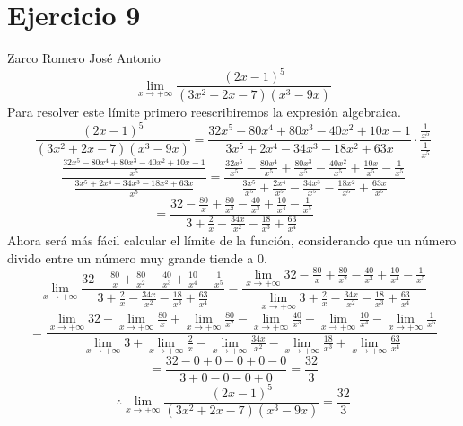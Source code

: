 \documentclass[12pt]{article}
\begin{document}
\section{Ejercicio 9}
Zarco Romero José Antonio\\
\[
\lim_{x \to +\infty}\frac{(2x-1)^5}{(3x^2+2x-7)(x^3-9x)}
\]
Para resolver este límite primero reescribiremos la expresión algebraica.
\[
\frac{(2x-1)^5}{(3x^2+2x-7)(x^3-9x)} = \frac{32x^{5}-80x^{4}+80x^{3}-40x^{2}+10x-1}{3x^{5}+2x^{4}-34x^{3}-18x^{2}+63x} \cdot \frac{\frac{1}{x^{5}}}{\frac{1}{x^{5}}}
\]
\[
\frac{ \frac{32x^{5}-80x^{4}+80x^{3}-40x^{2}+10x-1 }{x^{5}}}{ \frac{3x^{5}+2x^{4}-34x^{3}-18x^{2}+63x}{x^{5}}} = \frac{  \frac{32x^{5}}{x^{5}} - \frac{80x^{4}}{x^{5}} + \frac{80x^{3}}{x^{5}} - \frac{40x^{2}}{x^{5}} + \frac{10x}{x^{5}}- \frac{1}{x^{5}} }{
\frac{3x^{5}}{x^{5}} + \frac{2x^{4}}{x^{5}} - \frac{34x^{3}}{x^{5}} - \frac{18x^{2}}{x^{5}} + \frac{63x}{x^{5}}}
\]
\[ =
\frac
{  
	32 - \frac{80}{x} + \frac{80}{x^{2}} - \frac{40}{x^{3}} + \frac{10}{x^{4}}- \frac{1}{x^{5}} 
}
{
	3 + \frac{2}{x} - \frac{34x}{x^{2}} - \frac{18}{x^{3}} + \frac{63}{x^{4}}
}
\]
Ahora será más fácil calcular el límite de la función, considerando que un número divido entre un número muy grande tiende a 0.
\[
\lim_{x \to +\infty}
\frac{  
	32 - \frac{80}{x} + \frac{80}{x^{2}} - \frac{40}{x^{3}} + \frac{10}{x^{4}}- \frac{1}{x^{5}} 
}{
	3 + \frac{2}{x} - \frac{34x}{x^{2}} - \frac{18}{x^{3}} + \frac{63}{x^{4}}
}
= \frac{\lim_{x \to +\infty}
	32 - \frac{80}{x} + \frac{80}{x^{2}} - \frac{40}{x^{3}} + \frac{10}{x^{4}}- \frac{1}{x^{5}} 
}{\lim_{x \to +\infty}
	3 + \frac{2}{x} - \frac{34x}{x^{2}} - \frac{18}{x^{3}} + \frac{63}{x^{4}}}
\]
\[=\frac{
	\lim_{x \to +\infty}32 - 
	\lim_{x \to +\infty}\frac{80}{x} + 
	\lim_{x \to +\infty}\frac{80}{x^{2}} - 
	\lim_{x \to +\infty}\frac{40}{x^{3}} + 
	\lim_{x \to +\infty}\frac{10}{x^{4}}- 
	\lim_{x \to +\infty}\frac{1}{x^{5}} 
}{
	\lim_{x \to +\infty}3 + 
	\lim_{x \to +\infty}\frac{2}{x} - 
	\lim_{x \to +\infty}\frac{34x}{x^{2}} - 
	\lim_{x \to +\infty}\frac{18}{x^{3}} + 
	\lim_{x \to +\infty}\frac{63}{x^{4}}}
\]
\[
= \frac{32 - 0 + 0 - 0 + 0- 0 }{3 + 0- 0-0+ 0}
= \frac{32}{3}
\]
\[
\therefore \lim_{x \to +\infty}\frac{(2x-1)^5}{(3x^2+2x-7)(x^3-9x)} = \frac{32}{3}
\]
\end{document}
